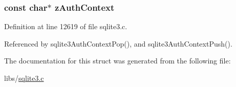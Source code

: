 \subsubsection[{z\+Auth\+Context}]{\setlength{\rightskip}{0pt plus 5cm}const char$\ast$ z\+Auth\+Context}\label{struct_auth_context_a7daea745aae6a12901c52fd4f28608dc}


Definition at line 12619 of file sqlite3.\+c.



Referenced by sqlite3\+Auth\+Context\+Pop(), and sqlite3\+Auth\+Context\+Push().



The documentation for this struct was generated from the following file\+:\begin{DoxyCompactItemize}
\item 
libs/\hyperlink{sqlite3_8c}{sqlite3.\+c}\end{DoxyCompactItemize}
